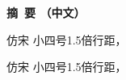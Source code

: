 \begin{center}
    { \hwfs\textbf{摘~要 （中文）} }
\end{center}

\begin{spacing}{1.5}
    {  \fangsong
    仿宋 小四号1.5倍行距，

    仿宋 小四号1.5倍行距，
    }
\end{spacing}
\newpage
